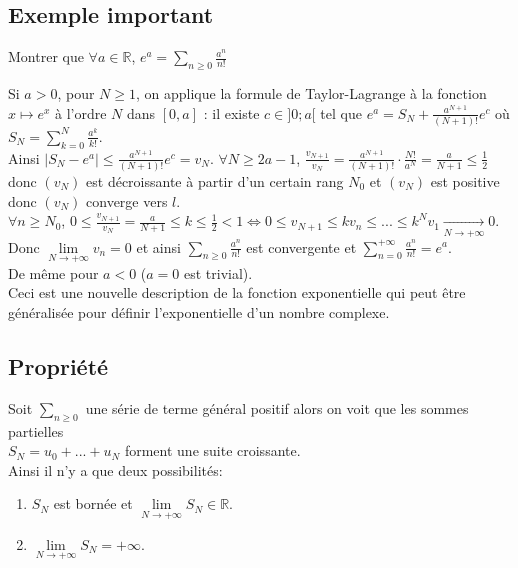 \documentclass[a4paper,10pt]{book} %
\newcommand{\R}{\mathbb{R}}
\newcommand{\abs}[1]{\left|#1\right|}
\newcommand{\displayAmath}{\displaystyle}
\begin{document}
\subsection{Exemple important}
Montrer que $\forall a\in\R$, $\displaystyle e^a=\sum_{n\geq 0} \frac{a^n}{n!}$

Si $a>0$, pour $N\geq 1$, on applique la formule de Taylor-Lagrange à la fonction $x\mapsto e^x$ à l'ordre $N$ dans $[0,a]$ :
il existe $c\in]0;a[$ tel que $e^a=S_N+\frac{a^{N+1}}{(N+1)!}e^c$ où $\displayAmath S_N=\sum_{k=0}^{N}\frac{a^k}{k!}$.\\

Ainsi $\displayAmath\abs{S_N-e^a}\leq \frac{a^{N+1}}{(N+1)!}e^c=v_N$.\hspace*{0.3cm} $\forall N\geq 2a-1$, $\displayAmath\frac{v_{N+1}}{v_N}=\frac{a^{N+1}}{(N+1)!}\cdot \frac{N!}{a^N}=\frac{a}{N+1}\leq \frac{1}{2}$ donc $(v_N)$ est décroissante à partir d'un certain rang $N_0$ et $(v_N)$ est positive donc $(v_N)$ converge vers $l$.\\

$\forall n\geq N_0$, $\displayAmath0\leq \frac{v_{N+1}}{v_N}=\frac{a}{N+1}\leq k\leq \frac{1}{2}<1\Leftrightarrow 0\leq v_{N+1}\leq kv_n\leq...\leq k^Nv_1 \underset{N\rightarrow +\infty}{\rightarrow}0$.\\

Donc $\lim\limits_{N\rightarrow+\infty}v_n=0$ et ainsi $\displayAmath\sum_{n\geq 0}\frac{a^n}{n!}$ est convergente et $\displayAmath\sum_{n= 0}^{+\infty}\frac{a^n}{n!}=e^a$.\\

De même pour $a<0$ ($a=0$ est trivial).\\

Ceci est une nouvelle description de la fonction exponentielle qui peut être généralisée pour définir l'exponentielle d'un nombre complexe.

\subsection{Propriété}
Soit $\displayAmath\sum_{n\geq 0}$ une série de terme général positif alors on voit que les sommes partielles\\$S_N=u_0+...+u_N$ forment une suite croissante.\\

Ainsi il n'y a que deux possibilités:\smallskip
\begin{enumerate}
\item $S_N$ est bornée et $\lim\limits_{N\rightarrow +\infty}S_N \in\R$.
\item $\lim\limits_{N\rightarrow+\infty}S_N=+\infty$.
\end{enumerate}
\end{document}
